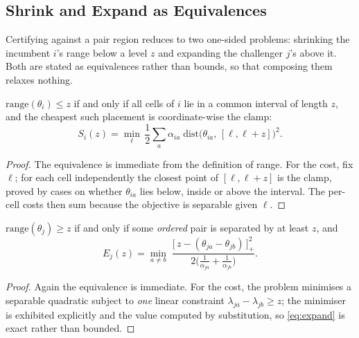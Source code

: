 \subsection{Shrink and Expand as Equivalences}
\label{sec:shrink}

Certifying against a pair region reduces to two one-sided problems: shrinking the incumbent
$i$'s range below a level $z$ and expanding the challenger $j$'s above it. Both are stated as
equivalences rather than bounds, so that composing them relaxes nothing.

\begin{theorem}[Shrink]
\label{thm:shrink}
$\mathrm{range}(\theta_{i})\le z$ if and only if all cells of $i$ lie in a common interval of
length $z$, and the cheapest such placement is coordinate-wise the clamp:
\begin{equation}
S_{i}(z)=\min_{\ell}\,\frac{1}{2}\sum_{a}\alpha_{ia}\;
\mathrm{dist}\bigl(\theta_{ia},\,[\ell,\ell+z]\bigr)^{2}.
\label{eq:shrink}
\end{equation}
\end{theorem}

\begin{proof}
The equivalence is immediate from the definition of range. For the cost, fix $\ell$; for each
cell independently the closest point of $[\ell,\ell+z]$ is the clamp, proved by cases on
whether $\theta_{ia}$ lies below, inside or above the interval. The per-cell costs then sum
because the objective is separable given $\ell$.
\end{proof}


\begin{theorem}[Expand]
\label{thm:expand}
$\mathrm{range}(\theta_{j})\ge z$ if and only if some \emph{ordered} pair is separated by at
least $z$, and
\begin{equation}
E_{j}(z)=\min_{a\neq b}\;
\frac{\bigl[\,z-(\theta_{ja}-\theta_{jb})\,\bigr]_{+}^{2}}
     {2\bigl(\frac{1}{\alpha_{ja}}+\frac{1}{\alpha_{jb}}\bigr)}.
\label{eq:expand}
\end{equation}
\end{theorem}

\begin{proof}
Again the equivalence is immediate. For the cost, the problem minimises a separable quadratic
subject to \emph{one} linear constraint $\lambda_{ja}-\lambda_{jb}\ge z$; the minimiser is
exhibited explicitly and the value computed by substitution, so \eqref{eq:expand} is exact
rather than bounded.
\end{proof}

